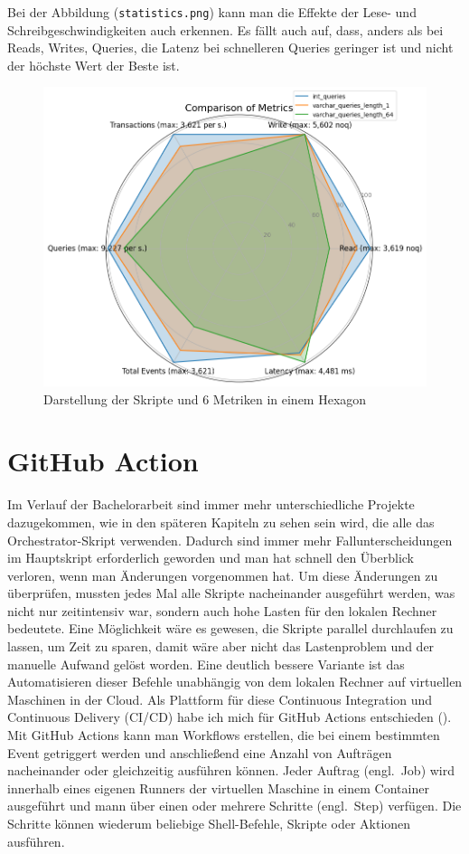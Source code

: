 Bei der Abbildung (\texttt{statistics.png}) kann man die Effekte der Lese- und Schreibgeschwindigkeiten auch erkennen.
Es fällt auch auf, dass, anders als bei Reads, Writes, Queries, die Latenz bei schnelleren Queries geringer ist und nicht der höchste Wert der Beste ist.

\begin{figure}[H]
    \centering
    \includegraphics[width=.6\textwidth]{PNGs/Script/Join_Typ/join-type/statistics}
    \caption[Join-Typ: Hexagon-Diagramm]{Darstellung der Skripte und 6 Metriken in einem Hexagon}
    \label{fig:join-typ-hex}
\end{figure}

\section{GitHub Action}\label{sec:github-action}

Im Verlauf der Bachelorarbeit sind immer mehr unterschiedliche Projekte dazugekommen, wie in den späteren Kapiteln zu sehen sein wird, die alle das Orchestrator-Skript verwenden.
Dadurch sind immer mehr Fallunterscheidungen im Hauptskript erforderlich geworden und man hat schnell den Überblick verloren, wenn man Änderungen vorgenommen hat.
Um diese Änderungen zu überprüfen, mussten jedes Mal alle Skripte nacheinander ausgeführt werden, was nicht nur zeitintensiv war, sondern auch hohe Lasten für den lokalen Rechner bedeutete.
Eine Möglichkeit wäre es gewesen, die Skripte parallel durchlaufen zu lassen, um Zeit zu sparen, damit wäre aber nicht das Lastenproblem und der manuelle Aufwand gelöst worden.
Eine deutlich bessere Variante ist das Automatisieren dieser Befehle unabhängig von dem lokalen Rechner auf virtuellen Maschinen in der Cloud.
Als Plattform für diese Continuous Integration und Continuous Delivery (CI/CD) habe ich mich für GitHub Actions entschieden (\cite{github_action_doku}).
Mit GitHub Actions kann man Workflows erstellen, die bei einem bestimmten Event getriggert werden und anschließend eine Anzahl von Aufträgen nacheinander oder gleichzeitig ausführen können.
Jeder Auftrag (engl.\ Job) wird innerhalb eines eigenen Runners der virtuellen Maschine in einem Container ausgeführt und mann über einen oder mehrere Schritte (engl.\ Step) verfügen.
Die Schritte können wiederum beliebige Shell-Befehle, Skripte oder Aktionen ausführen.

